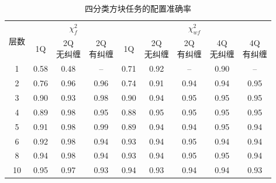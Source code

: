 \documentclass[a4paper]{ctexart}
\begin{document}
\begin{table}[H]
    \centering
    \caption{四分类方块任务的配置准确率}
    \renewcommand{\arraystretch}{1.2}
    \begin{tabular}{@{}c*{8}{c}@{}}
        \toprule
        \multirow{2}{*}{层数} & \multicolumn{3}{c}{$\chi_f^2$} & \multicolumn{5}{c}{$\chi_{wf}^2$}                                           \\
        \cmidrule(lr){2-4}\cmidrule(lr){5-9}
                            & 1Q                             & \shortstack{2Q                                                              \\无纠缠} & \shortstack{2Q\\有纠缠} & 1Q & \shortstack{2Q\\无纠缠} & \shortstack{2Q\\有纠缠} & \shortstack{4Q\\无纠缠} & \shortstack{4Q\\有纠缠} \\
        \midrule
        1                   & 0.58                           & 0.48                              & --   & 0.71 & 0.92 & --   & 0.90 & --   \\
        2                   & 0.76                           & 0.96                              & 0.96 & 0.74 & 0.91 & 0.94 & 0.94 & 0.95 \\
        3                   & 0.90                           & 0.93                              & 0.98 & 0.90 & 0.94 & 0.95 & 0.95 & 0.95 \\
        4                   & 0.89                           & 0.98                              & 0.95 & 0.88 & 0.95 & 0.95 & 0.95 & 0.95 \\
        5                   & 0.91                           & 0.98                              & 0.99 & 0.89 & 0.94 & 0.94 & 0.95 & 0.94 \\
        6                   & 0.92                           & 0.98                              & 0.94 & 0.93 & 0.94 & 0.95 & 0.94 & 0.94 \\
        8                   & 0.94                           & 0.98                              & 0.94 & 0.93 & 0.94 & 0.95 & 0.95 & 0.94 \\
        10                  & 0.95                           & 0.97                              & 0.93 & 0.94 & 0.93 & 0.94 & 0.94 & 0.93 \\
        \bottomrule
    \end{tabular}
\end{table}
\end{document}
